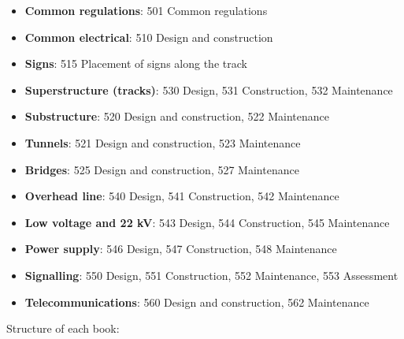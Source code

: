 \documentclass[]{article}
\providecommand{\tightlist}{%
  \setlength{\itemsep}{0pt}\setlength{\parskip}{0pt}}
\begin{document}
\begin{itemize}
\tightlist
\item
  \textbf{Common regulations}: 501 Common regulations
\item
  \textbf{Common electrical}: 510 Design and construction
\item
  \textbf{Signs}: 515 Placement of signs along the track
\item
  \textbf{Superstructure (tracks)}: 530 Design, 531 Construction, 532
  Maintenance
\item
  \textbf{Substructure}: 520 Design and construction, 522 Maintenance
\item
  \textbf{Tunnels}: 521 Design and construction, 523 Maintenance
\item
  \textbf{Bridges}: 525 Design and construction, 527 Maintenance
\item
  \textbf{Overhead line}: 540 Design, 541 Construction, 542 Maintenance
\item
  \textbf{Low voltage and 22 kV}: 543 Design, 544 Construction, 545
  Maintenance
\item
  \textbf{Power supply}: 546 Design, 547 Construction, 548 Maintenance
\item
  \textbf{Signalling}: 550 Design, 551 Construction, 552 Maintenance,
  553 Assessment
\item
  \textbf{Telecommunications}: 560 Design and construction, 562
  Maintenance
\end{itemize}

Structure of each book:
\end{document}
